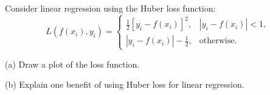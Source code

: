 Consider linear regression using the Huber loss function:
\[
L(f(x_i),y_i)=
\begin{cases}
\frac12[y_i-f(x_i)]^2,&|y_i-f(x_i)|<1,\\
|y_i-f(x_i)|-\frac12,&\text{otherwise}.
\end{cases}
\]


(a) Draw a plot of the loss function.


(b) Explain one benefit of using Huber loss for linear regression.
